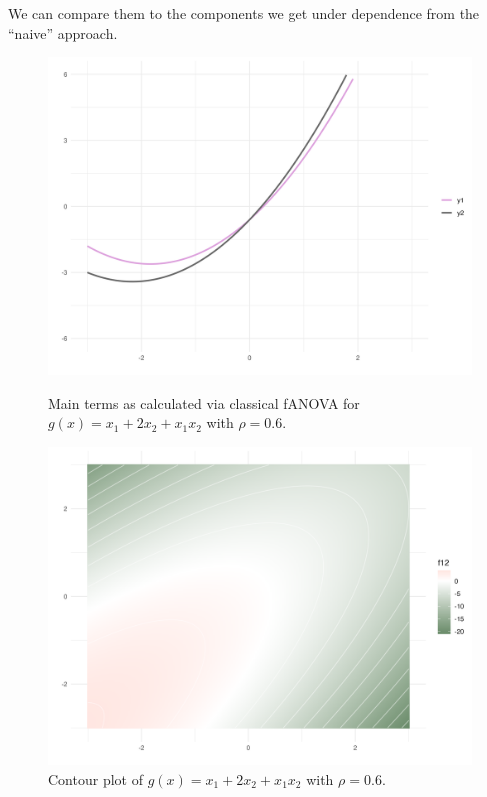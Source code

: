 


We can compare them to the components we get under dependence from the ``naive'' approach.
\begin{figure}[htpb]
    \centering
    \begin{minipage}[t]{0.49\textwidth}
        \centering
        \includegraphics[width=\textwidth]{images/p_main_effect_ex1_rho06.png}
        \caption{Main terms as calculated via classical fANOVA for $g(x) = x_1 + 2 x_2 + x_1 x_2$ with $\rho = 0.6$.}
        \label{fig:main_effects_ex1_rho06}
    \end{minipage}%
    \hfill
    \begin{minipage}[t]{0.49\textwidth}
        \centering
        \includegraphics[width=\textwidth]{images/p_contour_ex1_rho06.png}
        \caption{Contour plot of $g(x) = x_1 + 2 x_2 + x_1 x_2$ with $\rho = 0.6$.}
        \label{fig:contour_ex1_rho06}
    \end{minipage}
\end{figure}

